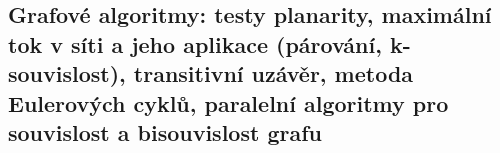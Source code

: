 \subsection{Grafové algoritmy: testy planarity, maximální tok v síti a jeho aplikace (párování, k-souvislost), transitivní uzávěr, metoda Eulerových cyklů, paralelní algoritmy pro souvislost a bisouvislost grafu}